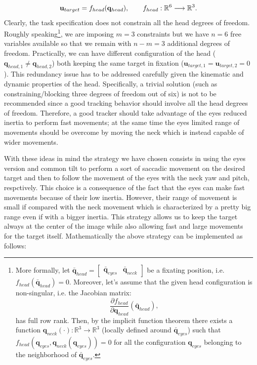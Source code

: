 \begin{eqnarray*}
\mathbf{u}_{target} = f_{head} (\mathbf q_{head}), \qquad f_{head} : \mathbb R^6 \longrightarrow \mathbb R^3.
\end{eqnarray*}
Clearly, the task specification does not constrain all the head degrees of freedom. Roughly speaking\footnote{More formally, let $\bar {\mathbf q}_{head} = \begin{bmatrix} \bar {\mathbf q}_{eyes} & \bar {\mathbf q}_{neck} \end{bmatrix}$ be a fixating position, i.e. $f_{head}(\bar {\mathbf q}_{head}) = 0$. Moreover, let's assume that the given head configuration is non-singular, i.e. the Jacobian matrix: $$\frac{\partial f_{head}}{\partial \mathbf q_{head}}(\bar {\mathbf q}_{head}),$$ has full row rank. Then, by the implicit function theorem there exists a function $\mathbf q_{neck}(\cdot): \mathbb R^3 \longrightarrow \mathbb R^3$ (locally defined around $\bar {\mathbf q}_{eyes}$) such that $f_{head}({\mathbf q}_{eyes}, {\mathbf q}_{neck} ({\mathbf q}_{eyes}) ) = 0$ for all the configuration ${\mathbf q}_{eyes}$ belonging to the neighborhood of $\bar {\mathbf q}_{eyes}$.}, we are imposing $m=3$ constraints but we have $n=6$ free variables available so that we remain with $n-m=3$ additional degrees of freedom. Practically, we can have different configuration of the head ($\mathbf q_{head,1} \neq \mathbf q_{head,2}$) both keeping the same target in fixation (${\mathbf u}_{target,1} = {\mathbf u}_{target,2} = 0$). This redundancy issue has to be addressed carefully given the kinematic and dynamic properties of the head. Specifically, a trivial solution (such as constraining/blocking three degrees of freedom out of six) is not to be recommended since a good tracking behavior should involve all the  head degrees of freedom. Therefore, a good tracker should take advantage of the eyes reduced inertia to perform fast movements; at the same time the eyes limited range of movements should be overcome by moving the neck which is instead capable of wider movements.

With these ideas in mind the strategy we have chosen consists in using the eyes version and common tilt to perform a sort of saccadic movement on the desired target and then to follow the movement of the eyes with the neck yaw and pitch, respctively. This choice is a consequence of the fact that the eyes can make fast movements because of their low inertia. However, their range of movement is small if compared with the neck movement which is characterized by a pretty big range even if with a bigger inertia. This strategy allows us to keep the target always at the center of the image while also allowing fast and large movements for the target itself. Mathematically the above strategy can be implemented as follows:

